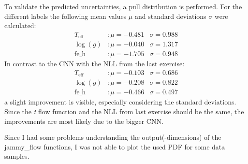 To validate the predicted uncertainties, a pull distribution is performed. For the different labels the following mean values $\mu$ and standard deviations $\sigma$ were calculated:
\begin{align*}
  T_\text{eff} &: \mu = -0.481 &  \sigma = 0.988\\
  \log(g) &: \mu = -0.040 & \sigma = 1.317\\
  \text{fe\_h} &: \mu = -1.705 & \sigma = 0.948
\end{align*}
In contrast to the CNN with the NLL from the last exercise:
\begin{align*}
  T_\text{eff} &: \mu = -0.103 &  \sigma = 0.686\\
  \log(g) &: \mu = -0.208 & \sigma = 0.822\\
  \text{fe\_h} &: \mu = -0.466 & \sigma = 0.497
\end{align*}
a slight improvement is visible, especially considering the standard deviations. Since the \textit{t} flow function and the NLL from last exercise should be the same, 
the improvements are most likely due to the bigger CNN.

Since I had some problems understanding the output(-dimensions) of the jammy\_flow functions, I was not able to plot the used PDF for some data samples.

